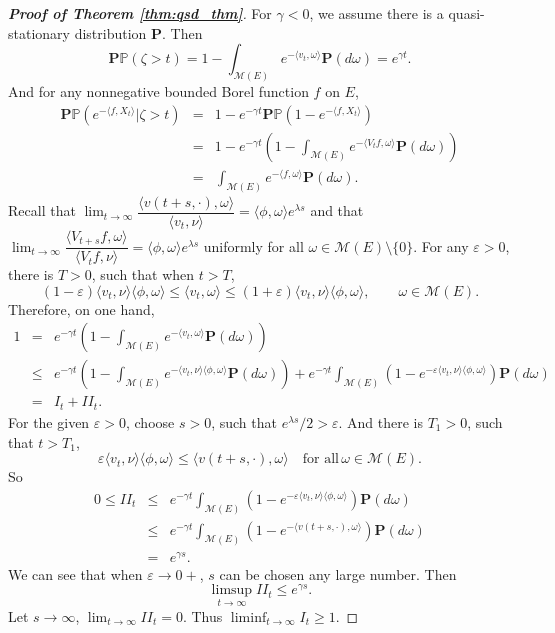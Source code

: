 \documentclass[12pt,a4paper]{amsart}
\numberwithin{equation}{section}
\theoremstyle{plain}
\theoremstyle{definition}
\begin{document}
{\begin{proof}[{\bf Proof of Theorem \ref{thm:qsd_thm}}]
  For $\gamma<0$, we assume there is a quasi-stationary distribution $\mathbf P$.  Then
  \[
    \mathbf P\mathbb P(\zeta>t)=1-\int_{\mathcal M(E)}e^{-\langle v_t,\omega\rangle }\mathbf P(d\omega)=e^{\gamma t}.
  \]
  And for any nonnegative bounded Borel function $f$ on $E$,
  \begin{eqnarray*}
    \mathbf P\mathbb P\left(e^{-\langle f, X_t\rangle }\big|\zeta>t\right)&=&1-e^{-\gamma t}\mathbf P\mathbb P\left(1-e^{-\langle f, X_t\rangle }\right)\\
                                                                          &=&1-e^{-\gamma t}\left(1-\int_{\mathcal M(E)}e^{-\langle V_tf,\omega\rangle }\mathbf P(d\omega)\right)\\
                                                                          &=&\int_{\mathcal M(E)}e^{-\langle f,\omega\rangle }\mathbf P(d\omega).
  \end{eqnarray*}
  Recall that $\lim_{t\rightarrow\infty}\dfrac{\langle v(t+s,\cdot),\omega\rangle }{\langle v_t,\nu\rangle }=\langle \phi,\omega\rangle e^{\lambda s} $ and that $\lim_{t\rightarrow\infty}\dfrac{\langle V_{t+s}f,\omega\rangle }{\langle V_tf,\nu\rangle }=\langle \phi,\omega\rangle e^{\lambda s}$ uniformly for all $\omega\in \mathcal M(E)\setminus\{0\}$.  For any $\varepsilon>0$, there is $T>0$, such that when $t>T$,
  \[
    (1-\varepsilon)\langle v_t,\nu\rangle \langle \phi,\omega\rangle\leq \langle v_t,\omega\rangle\leq (1+\varepsilon)\langle v_t,\nu\rangle \langle \phi,\omega\rangle,\qquad \omega\in\mathcal M(E).
  \]
  Therefore, on one hand,
  \begin{eqnarray*}
    1&=&e^{-\gamma t}\left(1-\int_{\mathcal M(E)}e^{-\langle v_t,\omega\rangle }\mathbf P(d\omega)\right)\\
     &\leq &e^{-\gamma t}\left(1-\int_{\mathcal M(E)}e^{-\langle v_t,\nu\rangle\langle\phi,\omega\rangle }\mathbf P(d\omega)\right)+e^{-\gamma t}\int_{\mathcal M(E)}\left(1-e^{-\varepsilon\langle v_t,\nu\rangle\langle\phi,\omega\rangle  }\right)\mathbf P(d\omega)\\
     &=&I_t+II_t.
  \end{eqnarray*}
  For the given $\varepsilon>0$, choose $s>0$, such that $e^{\lambda s}/2>\varepsilon$.  And there is $T_1>0$, such that $t>T_1$,
  \[
    \varepsilon\langle v_t,\nu\rangle\langle\phi,\omega\rangle\leq \langle v(t+s,\cdot),\omega\rangle \quad\mbox{for all}\, \omega\in\mathcal M(E).
  \]
  So
  \begin{eqnarray*}
    0\leq II_t&\leq& e^{-\gamma t}\int_{\mathcal M(E)}\left(1-e^{-\varepsilon\langle v_t,\nu\rangle\langle\phi,\omega\rangle  }\right)\mathbf P(d\omega)\\
              &\leq& e^{-\gamma t}\int_{\mathcal M(E)}\left(1-e^{-\langle v(t+s,\cdot),\omega\rangle  }\right)\mathbf P(d\omega)\\
              &=&e^{\gamma s}.
  \end{eqnarray*}
  We can see that when $\varepsilon\to0+$, $s$ can be chosen any large number.  Then
  \[
    \limsup_{t\to\infty}II_t\leq e^{\gamma s}.
  \]
  Let $s\to\infty$, $\lim_{t\to\infty}II_t=0$. Thus $\liminf_{t\to\infty}I_t\geq 1$.


\end{proof}}
\end{document}
